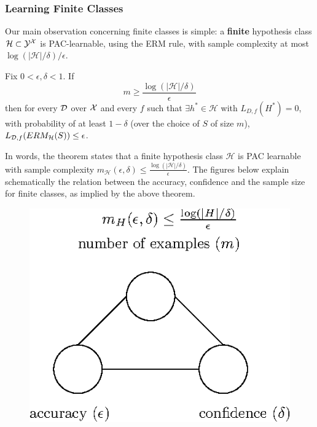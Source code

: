 \documentclass[11pt]{article}
\newcommand{\Hc}{\mathcal{H}}
\begin{document}
\subsubsection{Learning Finite Classes}

Our main observation concerning finite classes is simple: a {\bf finite} hypothesis
class $\Hc\subset\Y^\X$ is PAC-learnable, using the ERM rule,
with sample complexity at most 
$\log(|\Hc|/\delta)/\epsilon$.

\begin{theorem}
  Fix $0< \epsilon,\delta <1$. If \[m \ge \frac{\log(|\Hc|/\delta)}{\epsilon}\] 
  then for every $\mathcal{D}$ over $\mathcal{X}$ and every $f$ such that $\exists h^*\in\Hc$ with
  $L_{D,f}(H^*)=0$, with probability of at least $1-\delta$ (over the choice of $S$ of size $m$), $L_{\D,f}(ERM_\Hc(S)) \le \epsilon$.
\end{theorem}

In words, the theorem states that a finite hypothesis class $\Hc$ is PAC
learnable with sample complexity $m_\Hc(\epsilon,\delta)\leq
\frac{\log(|\Hc|/\delta)}{\epsilon}$.
The figures below explain schematically the relation between the accuracy, confidence and the sample size for finite classes, as implied by the above theorem.



  \begin{figure}[h!]
 \centering\includegraphics[scale=0.8]{connection_m_eps_delta_finite4.eps}
  \end{figure}
\end{document}
